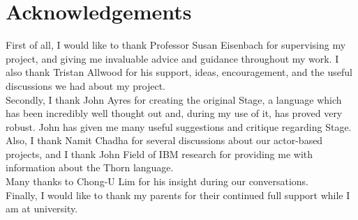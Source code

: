 \chapter*{Acknowledgements}

\noindent First of all, I would like to thank Professor Susan Eisenbach for supervising my project, and giving me invaluable advice and guidance throughout my work. I also thank Tristan Allwood for his support, ideas, encouragement, and the useful discussions we had about my project. \\

\noindent Secondly, I thank John Ayres for creating the original Stage, a language which has been incredibly well thought out and, during my use of it, has proved very robust. John has given me many useful suggestions and critique regarding Stage. \\

\noindent Also, I thank Namit Chadha for several discussions about our actor-based projects, and I thank John Field of IBM research for providing me with information about the Thorn language. \\

\noindent Many thanks to Chong-U Lim for his insight during our conversations. \\

\noindent Finally, I would like to thank my parents for their continued full support while I am at university.
